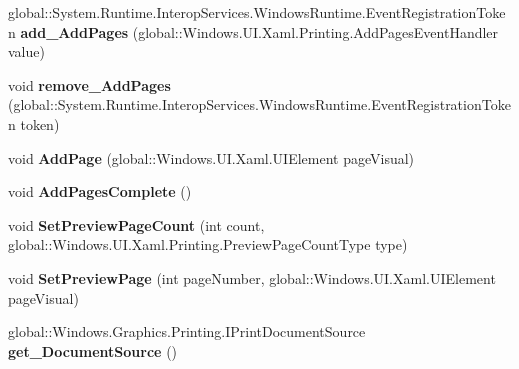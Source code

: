 \begin{DoxyCompactItemize}
global\+::\+System.\+Runtime.\+Interop\+Services.\+Windows\+Runtime.\+Event\+Registration\+Token {\bfseries add\+\_\+\+Add\+Pages} (global\+::\+Windows.\+U\+I.\+Xaml.\+Printing.\+Add\+Pages\+Event\+Handler value)
\item 
\mbox{\label{interface_windows_1_1_u_i_1_1_xaml_1_1_printing_1_1_i_print_document_a78e46b68309d6b34dfdab7f6631761a6}} 
void {\bfseries remove\+\_\+\+Add\+Pages} (global\+::\+System.\+Runtime.\+Interop\+Services.\+Windows\+Runtime.\+Event\+Registration\+Token token)
\item 
\mbox{\label{interface_windows_1_1_u_i_1_1_xaml_1_1_printing_1_1_i_print_document_ade20244bcf646d2b02009597f231a389}} 
void {\bfseries Add\+Page} (global\+::\+Windows.\+U\+I.\+Xaml.\+U\+I\+Element page\+Visual)
\item 
\mbox{\label{interface_windows_1_1_u_i_1_1_xaml_1_1_printing_1_1_i_print_document_afd3c80952164c742e794be2817c23c65}} 
void {\bfseries Add\+Pages\+Complete} ()
\item 
\mbox{\label{interface_windows_1_1_u_i_1_1_xaml_1_1_printing_1_1_i_print_document_a3fad032cb5b86f827a5b5428c9ba1d34}} 
void {\bfseries Set\+Preview\+Page\+Count} (int count, global\+::\+Windows.\+U\+I.\+Xaml.\+Printing.\+Preview\+Page\+Count\+Type type)
\item 
\mbox{\label{interface_windows_1_1_u_i_1_1_xaml_1_1_printing_1_1_i_print_document_a2fb474592368092099efc8562a7c1bb6}} 
void {\bfseries Set\+Preview\+Page} (int page\+Number, global\+::\+Windows.\+U\+I.\+Xaml.\+U\+I\+Element page\+Visual)
\item 
\mbox{\label{interface_windows_1_1_u_i_1_1_xaml_1_1_printing_1_1_i_print_document_a42077e57d55ca55665d043d48da3ec8a}} 
global\+::\+Windows.\+Graphics.\+Printing.\+I\+Print\+Document\+Source {\bfseries get\+\_\+\+Document\+Source} ()
\item 

\end{DoxyCompactItemize}

